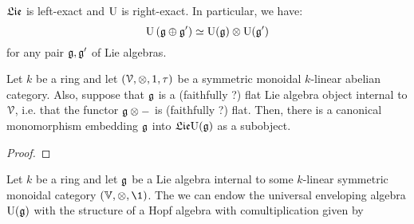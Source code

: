         \begin{corollary}
            $\mathfrak{Lie}$ is left-exact and $\mathrm{U}$ is right-exact. In particular, we have:
                $$\U\left(\g \oplus \g'\right) \cong \U(\g) \tensor \U(\g')$$
            for any pair $\mathfrak{g}, \mathfrak{g}'$ of Lie algebras. 
        \end{corollary}
        \begin{theorem} \label{theorem: embedding_lie_algebras_into_their_universal_enveloping_algebras}
            Let $k$ be a ring and let $(\calV, \tensor, 1, \tau)$ be a symmetric monoidal $k$-linear abelian category. Also, suppose that $\mathfrak{g}$ is a (faithfully ?) flat Lie algebra object internal to $\mathcal{V}$, i.e. that the functor $\g \tensor -$ is (faithfully ?) flat. Then, there is a canonical monomorphism embedding $\mathfrak{g}$ into $\mathfrak{Lie} \mathrm{U}(\mathfrak{g})$ as a subobject.
        \end{theorem}
            \begin{proof}
                
            \end{proof}
        \begin{corollary} \label{coro: universal_enveloping_algebras_are_bialgebras}
            Let $k$ be a ring and let $\mathfrak{g}$ be a Lie algebra internal to some $k$-linear symmetric monoidal category $(\V, \tensor, \1)$. The we can endow the universal enveloping algebra $\mathrm{U}(\mathfrak{g})$ with the structure of a Hopf algebra with comultiplication given by 
        \end{corollary}
        
